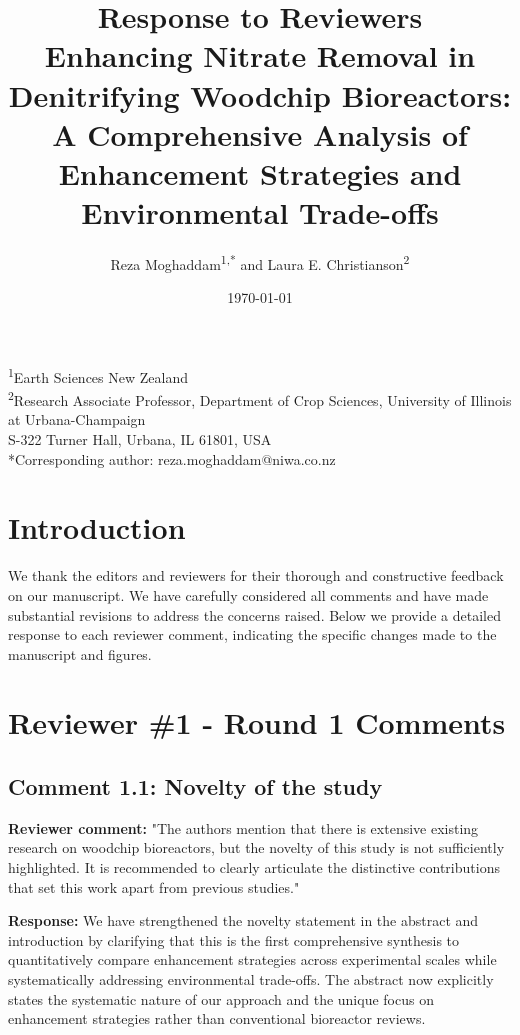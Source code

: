 \documentclass[12pt,a4paper]{article}
\title{Response to Reviewers\\
\large Enhancing Nitrate Removal in Denitrifying Woodchip Bioreactors: A Comprehensive Analysis of Enhancement Strategies and Environmental Trade-offs}
\author{Reza Moghaddam\textsuperscript{1,*} and Laura E. Christianson\textsuperscript{2}}
\date{\today}
\begin{document}
\maketitle

\begin{center}
\footnotesize
\textsuperscript{1}Earth Sciences New Zealand\\
\textsuperscript{2}Research Associate Professor, Department of Crop Sciences, University of Illinois at Urbana-Champaign\\
S-322 Turner Hall, Urbana, IL 61801, USA\\
*Corresponding author: reza.moghaddam@niwa.co.nz
\end{center}

\section*{Introduction}

We thank the editors and reviewers for their thorough and constructive feedback on our manuscript. We have carefully considered all comments and have made substantial revisions to address the concerns raised. Below we provide a detailed response to each reviewer comment, indicating the specific changes made to the manuscript and figures.

\section{Reviewer \#1 - Round 1 Comments}

\subsection{Comment 1.1: Novelty of the study}
\textbf{Reviewer comment:} "The authors mention that there is extensive existing research on woodchip bioreactors, but the novelty of this study is not sufficiently highlighted. It is recommended to clearly articulate the distinctive contributions that set this work apart from previous studies."

\textbf{Response:} We have strengthened the novelty statement in the abstract and introduction by clarifying that this is the first comprehensive synthesis to quantitatively compare enhancement strategies across experimental scales while systematically addressing environmental trade-offs. The abstract now explicitly states the systematic nature of our approach and the unique focus on enhancement strategies rather than conventional bioreactor reviews.
\end{document}
